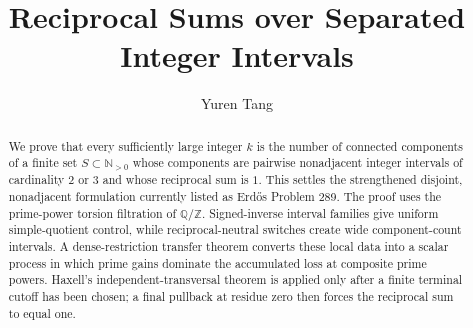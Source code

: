 \documentclass[11pt,a4paper,reqno]{amsart}
\title[Reciprocal Sums over Separated Intervals]{Reciprocal Sums over Separated Integer Intervals}
\author{Yuren Tang}
\date{}
\theoremstyle{definition}
\theoremstyle{remark}
\newcommand{\N}{\mathbb N}
\newcommand{\Q}{\mathbb Q}
\newcommand{\Z}{\mathbb Z}
\numberwithin{equation}{section}
\begin{document}
\begin{abstract}
We prove that every sufficiently large integer $k$ is the number of connected components of a finite set $S\subset\N_{>0}$ whose components are pairwise nonadjacent integer intervals of cardinality $2$ or $3$ and whose reciprocal sum is $1$. This settles the strengthened disjoint, nonadjacent formulation currently listed as Erd\H{o}s Problem 289. The proof uses the prime-power torsion filtration of $\Q/\Z$. Signed-inverse interval families give uniform simple-quotient control, while reciprocal-neutral switches create wide component-count intervals. A dense-restriction transfer theorem converts these local data into a scalar process in which prime gains dominate the accumulated loss at composite prime powers. Haxell's independent-transversal theorem is applied only after a finite terminal cutoff has been chosen; a final pullback at residue zero then forces the reciprocal sum to equal one.
\end{abstract}

\maketitle


\end{document}

